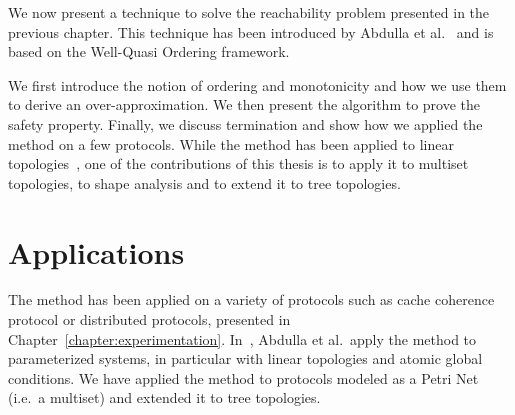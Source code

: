 \label{chapter:monotonic:abstraction}
%

We now present a technique to solve the reachability problem presented
in the previous chapter. This technique has been introduced by Abdulla
et al.~\cite{ACJT00} and is based on the Well-Quasi Ordering framework.

We first introduce the notion of ordering and monotonicity and how we
use them to derive an over-approximation. We then present the
algorithm to prove the safety property. Finally, we discuss
termination and show how we applied the method on a few protocols.
%
While the method has been applied to linear topologies~\cite{IJFCS09},
one of the contributions of this thesis is to apply it to multiset
topologies, to shape analysis and to extend it to tree topologies.






\section{Applications}
%

%
%
The method has been applied on a variety of protocols such as cache
coherence protocol or distributed protocols, presented in
Chapter~\ref{chapter:experimentation}.
%
In~\cite{ParamVerif:global:conditions,Parosh:non-atomic}, Abdulla et
al.\ apply the method to parameterized systems, in particular with
linear topologies and atomic global conditions. We have applied the
method to protocols modeled as a Petri Net (i.e.\ a multiset) and
extended it to tree topologies.







